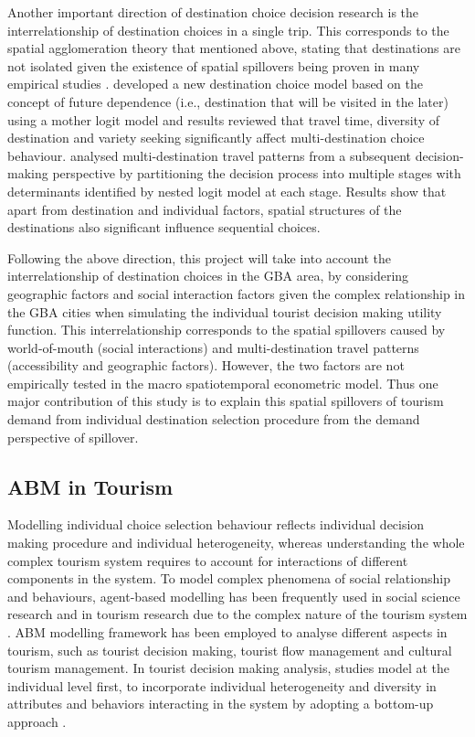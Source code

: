 \documentclass[11pt,a4paper]{amsart}
\theoremstyle{plain}
\theoremstyle{definition}
\begin{document}
\noindent Another important direction of destination choice decision research is the interrelationship of destination choices in a single trip. This corresponds to the spatial agglomeration theory that mentioned above, stating that destinations are not isolated given the existence of spatial spillovers being proven in many empirical studies \parencite{yangSpatialEconometricApproach2012}. \textcite{wuTouristMultiDestinationChoice2012} developed a new destination choice model based on the concept of future dependence (i.e., destination that will be visited in the later) using a mother logit model and results reviewed that travel time, diversity of destination and variety seeking significantly affect multi-destination choice behaviour. \textcite{yangMODELINGSEQUENTIALTOURIST2013} analysed multi-destination travel patterns from a subsequent decision-making perspective by partitioning the decision process into multiple stages with determinants identified by nested logit model at each stage. Results show that apart from destination and individual factors, spatial structures of the destinations also significant influence sequential choices. 

\noindent Following the above direction, this project will take into account the interrelationship of destination choices in the GBA area, by considering geographic factors and social interaction factors given the complex relationship in the GBA cities when simulating the individual tourist decision making utility function. This interrelationship corresponds to the spatial spillovers caused by world-of-mouth (social interactions) and multi-destination travel patterns (accessibility and geographic factors). However, the two factors are not empirically tested in the macro spatiotemporal econometric model. Thus one major contribution of this study is to explain this spatial spillovers of tourism demand from individual destination selection procedure from the demand perspective of spillover. 

\subsection{ABM in Tourism}\hfill\par
\noindent Modelling individual choice selection behaviour reflects individual decision making procedure and individual heterogeneity, whereas understanding the whole complex tourism system requires to account for interactions of different components in the system. To model complex phenomena of social relationship and behaviours, agent-based modelling has been frequently used in social science research and in tourism research due to the complex nature of the tourism system \parencite{boavida-portugalWhereVacationAgentbased2017}. ABM modelling framework has been employed to analyse different aspects in tourism, such as tourist decision making,  tourist flow management and cultural tourism management. In tourist decision making analysis, studies model at the individual level first, to incorporate individual heterogeneity and diversity in attributes and behaviors interacting in the system by adopting a bottom-up approach \parencite{macalTutorialAgentbasedModelling2010}.
\end{document}
